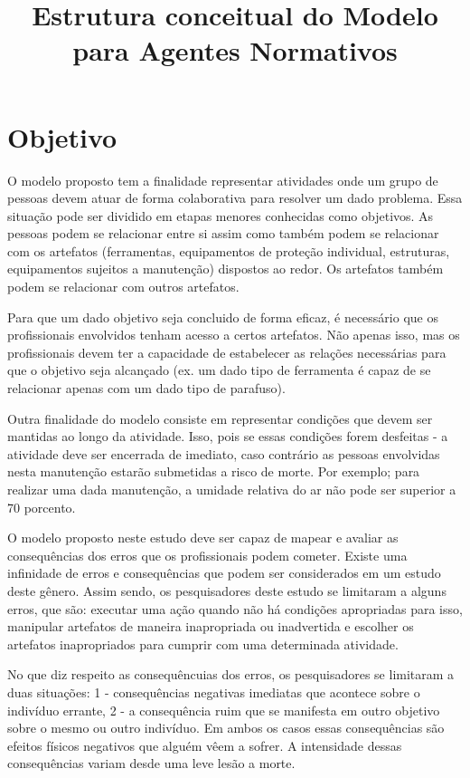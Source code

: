 \documentclass[12pt]{article}
\title{Estrutura conceitual do Modelo para Agentes Normativos}
\begin{document}
 

\section{Objetivo}

O modelo proposto tem a finalidade representar atividades onde um grupo de pessoas devem atuar de forma colaborativa para resolver um dado problema. Essa situação pode ser dividido em etapas menores conhecidas como objetivos. As pessoas podem se relacionar entre si assim como também podem se relacionar com os artefatos (ferramentas, equipamentos de proteção individual, estruturas, equipamentos sujeitos a manutenção) dispostos ao redor. Os artefatos também podem se relacionar com outros artefatos.

Para que um dado objetivo seja concluido de forma eficaz, é necessário que os profissionais envolvidos tenham acesso a certos artefatos. Não apenas isso, mas os profissionais devem ter a capacidade de estabelecer as relações necessárias para que o objetivo seja alcançado (ex. um dado tipo de ferramenta é capaz de se relacionar apenas com um dado tipo de parafuso).  

Outra finalidade do modelo consiste em representar condições que devem ser mantidas ao longo da atividade. Isso, pois se essas condições forem desfeitas - a atividade deve ser encerrada de imediato, caso contrário as pessoas envolvidas nesta manutenção estarão submetidas a risco de morte. Por exemplo; para realizar uma dada manutenção, a umidade relativa do ar não pode ser superior a 70 porcento. 

O modelo proposto neste estudo deve ser capaz de mapear e avaliar as consequências dos erros que os profissionais podem cometer. Existe uma infinidade de erros e consequências que podem ser considerados em um estudo deste gênero. Assim sendo, os pesquisadores deste estudo se limitaram a alguns erros, que são: executar uma ação quando não há condições apropriadas para isso, manipular artefatos de maneira inapropriada ou inadvertida e escolher os artefatos inapropriados para cumprir com uma determinada atividade.

No que diz respeito as consequêncuias dos erros, os pesquisadores se limitaram a duas situações: 1 - consequências negativas imediatas que acontece sobre o indivíduo errante, 2 - a consequência ruim que se manifesta em outro objetivo sobre o mesmo ou outro indivíduo. Em ambos os casos essas consequências são efeitos físicos negativos que alguém vêem a sofrer. A intensidade dessas consequências variam desde uma leve lesão a morte.
\end{document}
